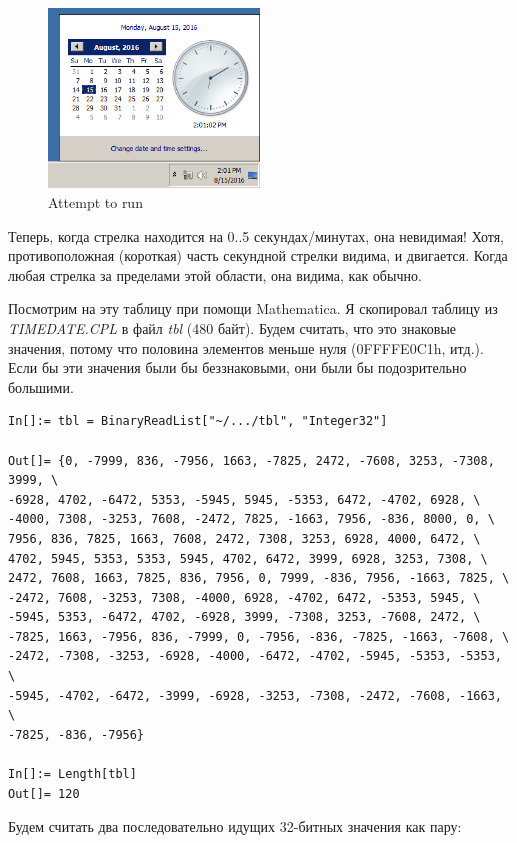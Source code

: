 \begin{figure}[H]
\centering
\includegraphics[width=0.5\textwidth]{examples/timedate/6_pairs_zeroed.png}
\caption{Attempt to run}
\end{figure}

Теперь, когда стрелка находится на 0..5 секундах/минутах, она невидимая! Хотя, противоположная (короткая) часть секундной
стрелки видима, и двигается.
Когда любая стрелка за пределами этой области, она видима, как обычно.

Посмотрим на эту таблицу при помощи Mathematica.
Я скопировал таблицу из \emph{TIMEDATE.CPL} в файл \emph{tbl} (480 байт).
Будем считать, что это знаковые значения, потому что половина элементов меньше нуля (0FFFFE0C1h, итд.).
Если бы эти значения были бы беззнаковыми, они были бы подозрительно большими.

\begin{lstlisting}[style=custommath]
In[]:= tbl = BinaryReadList["~/.../tbl", "Integer32"]

Out[]= {0, -7999, 836, -7956, 1663, -7825, 2472, -7608, 3253, -7308, 3999, \
-6928, 4702, -6472, 5353, -5945, 5945, -5353, 6472, -4702, 6928, \
-4000, 7308, -3253, 7608, -2472, 7825, -1663, 7956, -836, 8000, 0, \
7956, 836, 7825, 1663, 7608, 2472, 7308, 3253, 6928, 4000, 6472, \
4702, 5945, 5353, 5353, 5945, 4702, 6472, 3999, 6928, 3253, 7308, \
2472, 7608, 1663, 7825, 836, 7956, 0, 7999, -836, 7956, -1663, 7825, \
-2472, 7608, -3253, 7308, -4000, 6928, -4702, 6472, -5353, 5945, \
-5945, 5353, -6472, 4702, -6928, 3999, -7308, 3253, -7608, 2472, \
-7825, 1663, -7956, 836, -7999, 0, -7956, -836, -7825, -1663, -7608, \
-2472, -7308, -3253, -6928, -4000, -6472, -4702, -5945, -5353, -5353, \
-5945, -4702, -6472, -3999, -6928, -3253, -7308, -2472, -7608, -1663, \
-7825, -836, -7956}

In[]:= Length[tbl]
Out[]= 120
\end{lstlisting}

Будем считать два последовательно идущих 32-битных значения как пару:

